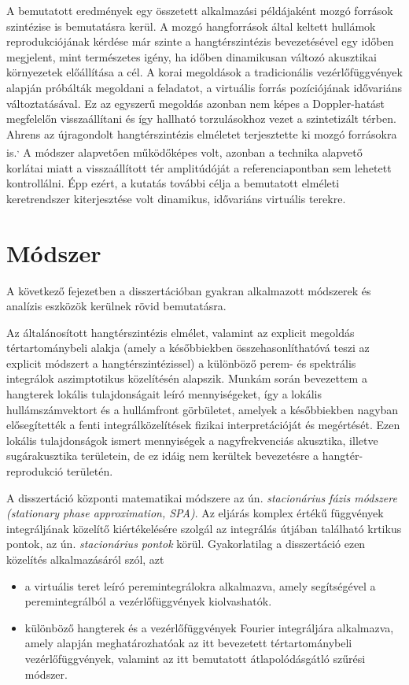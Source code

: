 \documentclass[10pt,twoside]{article}
\theoremstyle{thesisgroupstyle}
\theoremstyle{indented}
\begin{document}
A bemutatott eredmények egy összetett alkalmazási példájaként mozgó források szintézise is bemutatásra kerül.
A mozgó hangforrások által keltett hullámok reprodukciójának kérdése már szinte a hangtérszintézis bevezetésével egy időben megjelent, mint természetes igény, ha időben dinamikusan változó akusztikai környezetek előállítása a cél.
A korai megoldások a tradicionális vezérlőfüggvények alapján próbálták megoldani a feladatot, a virtuális forrás pozíciójának idővariáns változtatásával.
Ez az egyszerű megoldás azonban nem képes a Doppler-hatást megfelelőn visszaállítani és így hallható torzulásokhoz vezet a szintetizált térben.
Ahrens az újragondolt hangtérszintézis elméletet terjesztette ki mozgó forrásokra is.\textsuperscript{,}
A módszer alapvetően működőképes volt, azonban a technika alapvető korlátai miatt a visszaállított tér amplitúdóját a referenciapontban sem lehetett kontrollálni.
Épp ezért, a kutatás további célja a bemutatott elméleti keretrendszer kiterjesztése volt dinamikus, idővariáns virtuális terekre.

\section{Módszer}

A következő fejezetben a disszertációban gyakran alkalmazott módszerek és analízis eszközök kerülnek rövid bemutatásra.

Az általánosított hangtérszintézis elmélet, valamint az explicit megoldás tértartománybeli alakja (amely a későbbiekben összehasonlíthatóvá teszi az explicit módszert a hangtérszintézissel) a különböző perem- és spektrális integrálok aszimptotikus közelítésén alapszik.
Munkám során bevezettem a hangterek lokális tulajdonságait leíró mennyiségeket, így a lokális hullámszámvektort és a hullámfront görbületet, amelyek a későbbiekben nagyban elősegítették a fenti integrálközelítések fizikai interpretációját és megértését.
Ezen lokális tulajdonságok ismert mennyiségek a nagyfrekvenciás akusztika, illetve sugárakusztika területein, de ez idáig nem kerültek bevezetésre a hangtér-reprodukció területén.

A disszertáció központi matematikai módszere az ún. \emph{stacionárius fázis módszere (stationary phase approximation, SPA)}.
Az eljárás komplex értékű függvények integráljának közelítő kiértékelésére szolgál az integrálás útjában található krtikus pontok, az ún. \emph{stacionárius pontok} körül.
Gyakorlatilag a disszertáció ezen közelítés alkalmazásáról szól, azt 
\begin{itemize}
\item a virtuális teret leíró peremintegrálokra alkalmazva, amely segítségével a peremintegrálból a vezérlőfüggvények kiolvashatók.
\item különböző hangterek és a vezérlőfüggvények Fourier integráljára alkalmazva, amely alapján meghatározhatóak az itt bevezetett tértartománybeli vezérlőfüggvények, valamint az itt bemutatott átlapolódásgátló szűrési módszer.
\end{itemize}
\end{document}
